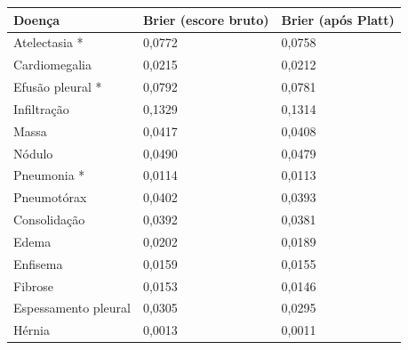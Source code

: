 \begin{tabular}{lll}
\toprule
Doença & Brier (escore bruto) & Brier (após Platt) \\
\midrule
Atelectasia * & 0,0772 & 0,0758 \\
Cardiomegalia & 0,0215 & 0,0212 \\
Efusão pleural * & 0,0792 & 0,0781 \\
Infiltração & 0,1329 & 0,1314 \\
Massa & 0,0417 & 0,0408 \\
Nódulo & 0,0490 & 0,0479 \\
Pneumonia * & 0,0114 & 0,0113 \\
Pneumotórax & 0,0402 & 0,0393 \\
Consolidação & 0,0392 & 0,0381 \\
Edema & 0,0202 & 0,0189 \\
Enfisema & 0,0159 & 0,0155 \\
Fibrose & 0,0153 & 0,0146 \\
Espessamento pleural & 0,0305 & 0,0295 \\
Hérnia & 0,0013 & 0,0011 \\
\bottomrule
\end{tabular}
